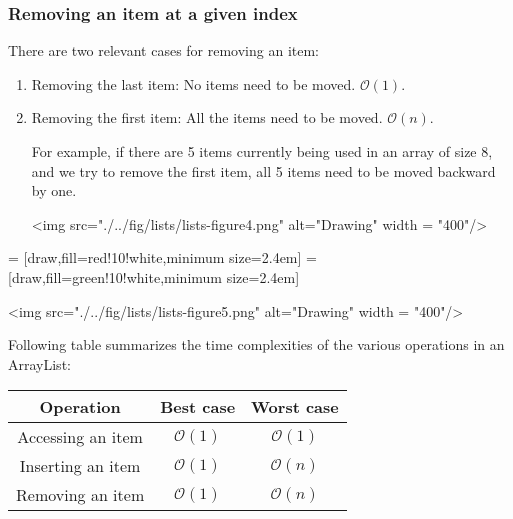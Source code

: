 \subsubsection{Removing an item at a given index}

There are two relevant cases for removing an item:

\begin{enumerate}
\item Removing the last item: No items need to be moved. $\mathcal{O}(1)$.
\item Removing the first item: All the items need to be moved. $\mathcal{O}(n)$.

For example, if there are 5 items currently being used in an array of size 8, and we try to remove the first item, all 5 items need to be moved backward by one.

<img src="./../fig/lists/lists-figure4.png" alt="Drawing" width = "400"/>
\end{enumerate}

 = [draw,fill=red!10!white,minimum size=2.4em]
 = [draw,fill=green!10!white,minimum size=2.4em]

\newcommand{\data}{{{12.5, 6.4, 8.5, 9.6, -3.4, 0, 0, 0},
					{6.4, 6.4, 8.5, 9.6, -3.4, 0, 0, 0},
					{6.4, 8.5, 8.5, 9.6, -3.4, 0, 0, 0},
					{6.4, 8.5, 9.6, 9.6, -3.4, 0, 0, 0},
					{6.4, 8.5, 9.6, -3.4, -3.4, 0, 0, 0},
					{6.4, 8.5, 9.6, -3.4, -3.4, 0, 0, 0}}}
<img src="./../fig/lists/lists-figure5.png" alt="Drawing" width = "400"/>

\vskip 1cm

Following table summarizes the time complexities of the various operations in an ArrayList:

\Large
\begin{center}
  \begin{tabular}{c|c|c}
    Operation & Best case & Worst case\\
    \hline
    Accessing an item & \color{ForestGreen} $\mathcal{O}(1)$ \color{black} & \color{ForestGreen} $\mathcal{O}(1)$ \color{black}\\
    \hline
    Inserting an item & \color{ForestGreen} $\mathcal{O}(1)$ \color{black} & \color{red} $\mathcal{O}(n)$ \color{black} \\
    \hline
    Removing an item & \color{ForestGreen} $\mathcal{O}(1)$ \color{black} & \color{red} $\mathcal{O}(n)$ \color{black}
  \end{tabular}
\end{center}
\normalsize

